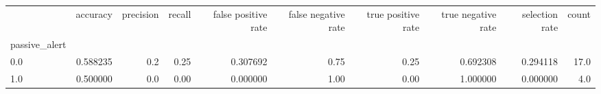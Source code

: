 \begin{tabular}{lrrrrrrrrr}
\toprule
{} &  accuracy &  precision &  recall &  false positive rate &  false negative rate &  true positive rate &  true negative rate &  selection rate &  count \\
passive\_alert &           &            &         &                      &                      &                     &                     &                 &        \\
\midrule
0.0           &  0.588235 &        0.2 &    0.25 &             0.307692 &                 0.75 &                0.25 &            0.692308 &        0.294118 &   17.0 \\
1.0           &  0.500000 &        0.0 &    0.00 &             0.000000 &                 1.00 &                0.00 &            1.000000 &        0.000000 &    4.0 \\
\bottomrule
\end{tabular}
